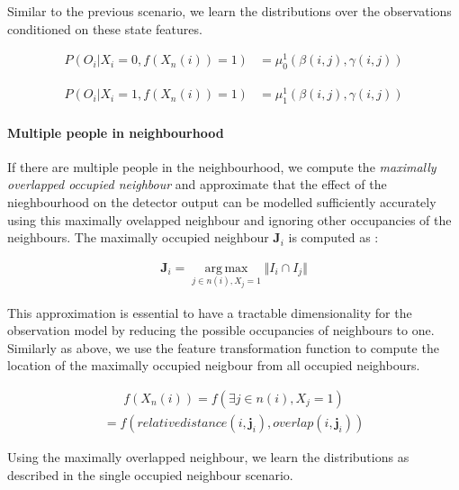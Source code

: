 \documentclass[10pt,twocolumn,letterpaper]{article}
\begin{document}
Similar to the previous scenario, we learn the distributions over the observations conditioned on these state features.

\begin{align}
 P(O_{i} |X_{i}=0 ,f(X_n(i))=1 )  &=\mu^{1}_{0}(\beta(i,j),\gamma(i,j))
\end{align}

\begin{align}
 P(O_{i} |X_{i}=1 ,f(X_n(i))=1 )  &=\mu^{1}_{1}(\beta(i,j),\gamma(i,j))
\end{align}


\paragraph{Multiple people in neighbourhood}
If there are multiple people in the neighbourhood, we compute the \textit{maximally overlapped occupied neighbour} and approximate that the effect of the nieghbourhood on the detector output can be modelled sufficiently accurately using this maximally ovelapped neighbour and ignoring other occupancies of the neighbours. The maximally occupied neighbour $ \textbf{J}_{i} $ is computed as :

\begin{align}
 \textbf{J}_{i} = \operatorname*{arg\,max}_{j\in n(i),X_{j}=1} \Vert I_{i}\cap I_{j} \Vert  
\end{align}

This approximation is essential to have a tractable dimensionality for the observation model by reducing the possible occupancies of neighbours to one. 
Similarly as above, we use the feature transformation function to compute the location of the maximally occupied neigbour from all occupied neighbours.

\begin{align}
f(X_n(i)) = f(\exists j \in{n(i)},X_{j} =1)
\end{align}
\begin{align}
= f(relativedistance(i,\textbf{j}_{i}),overlap(i,\textbf{j}_{i}))
\end{align}

Using the maximally overlapped neighbour, we learn the distributions as described in the single occupied neighbour scenario.


%
%
%
\end{document}
